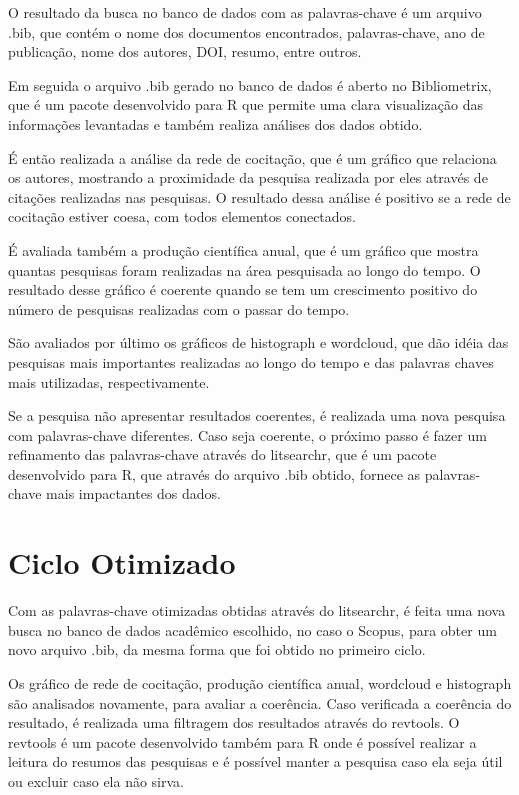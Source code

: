 O resultado da busca no banco de dados com as palavras-chave é um arquivo .bib, que contém o nome dos documentos encontrados, palavras-chave, ano de publicação, nome dos autores, DOI, resumo, entre outros.

Em seguida o arquivo .bib gerado no banco de dados é aberto no Bibliometrix, que é um pacote desenvolvido para R que permite uma clara visualização das informações levantadas e também realiza análises dos dados obtido. 

É então realizada a análise da rede de cocitação, que é um gráfico que relaciona os autores, mostrando a proximidade da pesquisa realizada por eles através de citações realizadas nas pesquisas. O resultado dessa análise é positivo se a rede de cocitação estiver coesa, com todos elementos conectados.

É avaliada também a produção científica anual, que é um gráfico que mostra quantas pesquisas foram realizadas na área pesquisada ao longo do tempo. O resultado desse gráfico é coerente quando se tem um crescimento positivo do número de pesquisas realizadas com o passar do tempo.

São avaliados por último os gráficos de histograph e wordcloud, que dão idéia das pesquisas mais importantes realizadas ao longo do tempo e das palavras chaves mais utilizadas, respectivamente.

Se a pesquisa não apresentar resultados coerentes, é realizada uma nova pesquisa com palavras-chave diferentes. Caso seja coerente, o próximo passo é fazer um refinamento das palavras-chave através do litsearchr, que é um pacote desenvolvido para R, que através do arquivo .bib obtido, fornece as palavras-chave mais impactantes dos dados.

\section{Ciclo Otimizado}
Com as palavras-chave otimizadas obtidas através do litsearchr, é feita uma nova busca no banco de dados acadêmico escolhido, no caso o Scopus, para obter um novo arquivo .bib, da mesma forma que foi obtido no primeiro ciclo.

Os gráfico de rede de cocitação, produção científica anual, wordcloud e histograph são analisados novamente, para avaliar a coerência. Caso verificada a coerência do resultado, é realizada uma filtragem dos resultados através do revtools. O revtools é um pacote desenvolvido também para R onde é possível realizar a leitura do resumos das pesquisas e é possível manter a pesquisa caso ela seja útil ou excluir caso ela não sirva.

